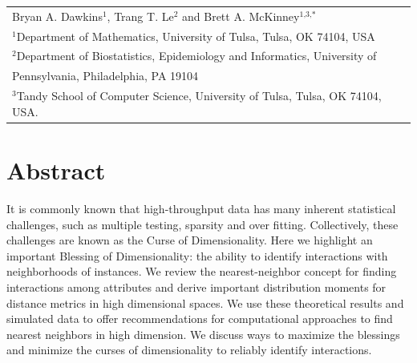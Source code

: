 \documentclass[10pt,letterpaper]{article}\usepackage[]{graphicx}\usepackage[]{color}
\begin{document}
\vspace*{0.2in}

{\Large
\textbf{} %
}
\begin{center}
  \begin{tabular}{l}
  Bryan A. Dawkins$^{\text{1}}$, Trang T. Le$^{\text{2}}$ and Brett A. McKinney$^{\text{1,3,}*}$ \\
  $^{\text{1}}$Department of Mathematics, University of Tulsa, Tulsa, OK 74104, USA \\
  $^{\text{2}}$Department of Biostatistics, Epidemiology and Informatics, University of \\
  \hphantom{2}Pennsylvania, Philadelphia, PA 19104 \\
  $^{\text{3}}$Tandy School of Computer Science, University of Tulsa, Tulsa, OK 74104, USA.
  \end{tabular}
\end{center}


\section*{Abstract}
It is commonly known that high-throughput data has many inherent statistical challenges, such as multiple testing, sparsity and over fitting. Collectively, these challenges are known as the Curse of Dimensionality. Here we highlight an important Blessing of Dimensionality: the ability to identify interactions with neighborhoods of instances. We review the nearest-neighbor concept for finding interactions among attributes and derive important distribution moments for distance metrics in high dimensional spaces. We use these theoretical results and simulated data to offer recommendations for computational approaches to find nearest neighbors in high dimension. We discuss ways to maximize the blessings and minimize the curses of dimensionality to reliably identify interactions.  
\end{document}

